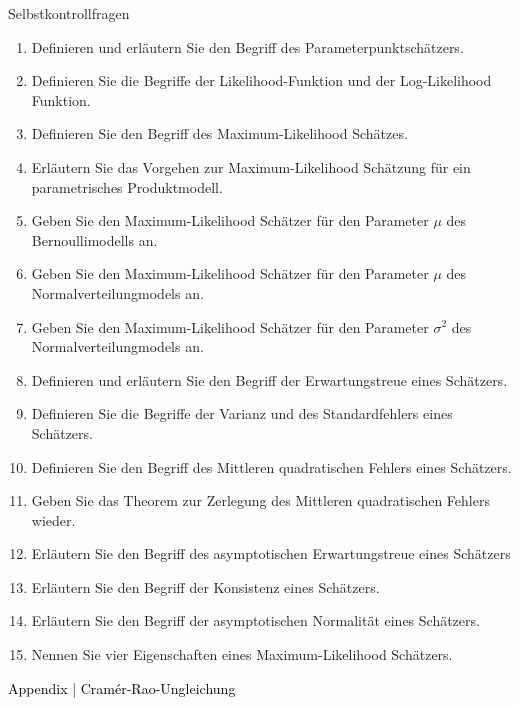 \documentclass[
  8pt,
  ignorenonframetext,
]{beamer}
\begin{document}
\begin{frame}{Selbstkontrollfragen}
\protect\hypertarget{selbstkontrollfragen}{}
\footnotesize
{}
\begin{enumerate}
\item Definieren und erläutern Sie den Begriff des Parameterpunktschätzers.
\item Definieren Sie die Begriffe der Likelihood-Funktion und der Log-Likelihood Funktion.
\item Definieren Sie den Begriff des Maximum-Likelihood Schätzes.
\item Erläutern Sie das Vorgehen zur Maximum-Likelihood Schätzung für ein parametrisches Produktmodell.
\item Geben Sie den Maximum-Likelihood Schätzer für den Parameter $\mu$ des Bernoullimodells an.
\item Geben Sie den Maximum-Likelihood Schätzer für den Parameter $\mu$ des Normalverteilungmodels an.
\item Geben Sie den Maximum-Likelihood Schätzer für den Parameter $\sigma^2$ des Normalverteilungmodels an.
\item Definieren und erläutern Sie den Begriff der Erwartungstreue eines Schätzers.
\item Definieren Sie die Begriffe der Varianz und des Standardfehlers eines Schätzers.
\item Definieren Sie den Begriff des Mittleren quadratischen Fehlers eines Schätzers.
\item Geben Sie das Theorem zur Zerlegung des Mittleren quadratischen Fehlers wieder.
\item Erläutern Sie den Begriff des asymptotischen Erwartungstreue eines Schätzers
\item Erläutern Sie den Begriff der Konsistenz eines Schätzers.
\item Erläutern Sie den Begriff der asymptotischen Normalität eines Schätzers.
\item Nennen Sie vier Eigenschaften eines Maximum-Likelihood Schätzers.
\end{enumerate}
\end{frame}

\begin{frame}[plain]{}
\protect\hypertarget{section-13}{}
\vfill
\center
\huge

\textcolor{black}{Appendix | Cramér-Rao-Ungleichung} \vfill
\end{frame}
\end{document}
